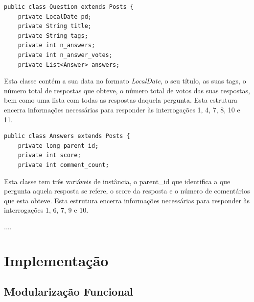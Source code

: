 \documentclass[a4paper]{article}
\begin{document}
\begin{verbatim}
public class Question extends Posts {
    private LocalDate pd;
    private String title;
    private String tags;
    private int n_answers;
    private int n_answer_votes;
    private List<Answer> answers;
\end{verbatim}


Esta classe contém a sua data no formato \textit{LocalDate}, o seu título,
as suas tags, o número total de respostas que obteve, o número total de votos
das suas respostas, bem como uma lista com todas as respostas daquela pergunta.
Esta estrutura encerra informações necessárias para responder às interrogações 1,
4, 7, 8, 10 e 11.


\begin{verbatim}
public class Answers extends Posts {
    private long parent_id;
    private int score;
    private int comment_count;
\end{verbatim}

Esta classe tem três variáveis de instância, o parent\_id que identifica a que
pergunta aquela resposta se refere, o score da resposta e o número de comentários
que esta obteve.
Esta estrutura encerra informações necessárias para responder às interrogações 1,
6, 7, 9 e 10.


....


\section{Implementação}
\label{sec:implementacao}

\subsection{Modularização Funcional}
\label{sec:organizacao}
\end{document}

